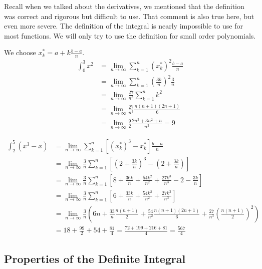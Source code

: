 \documentclass[fleqn]{report}
\begin{document}
Recall when we talked about the derivatives, we mentioned that
the definition was correct and rigorous but difficult to use.
That comment is also true here, but even more severe. The
definition of the integral is nearly impossible to use for
most functions. We will only try to use the definition for
small order polynomials.

\begin{example} 
We choose $x_k^* = a + k \frac{b-a}{n}$.
\begin{align*}
\int_0^3 x^2 
& = \lim_{n \rightarrow \infty} \sum_{k=1}^n (x^*_k)^2
\frac{b-a}{n} \\
& = \lim_{n \rightarrow \infty} \sum_{k=1}^n \left( \frac{3k}{n}
\right)^2 \frac{3}{n} \\
& = \lim_{n \rightarrow \infty} \frac{27}{n^3} \sum_{k=1}^n k^2 \\
& = \lim_{n \rightarrow \infty} \frac{27}{n^3} \frac{n(n+1)(2n+1)}{6} \\
& = \lim_{n \rightarrow \infty} \frac{9}{2}
\frac{2n^3+3n^2+n}{n^3} = 9
\end{align*}
\end{example}

\begin{example}
\begin{align*}
\int_2^5 (x^3-x) 
& = \lim_{n \rightarrow \infty} \sum_{k=1}^n \left[ (x^*_k)^3 -
x^*_k \right] \frac{b-a}{n} \\
& = \lim_{n \rightarrow \infty} \frac{3}{n} \sum_{k=1}^n \left[
\left(2 + \frac{3k}{n} \right)^3 - \left(2+ \frac{3k}{n}
\right) \right] \\
& = \lim_{n \rightarrow \infty} \frac{3}{n} \sum_{k=1}^n \left[
8 + \frac{36k}{n} + \frac{54k^2}{n^2} + \frac{27k^3}{n^3} - 2 -
\frac{3k}{n} \right] \\
& = \lim_{n \rightarrow \infty} \frac{3}{n} \sum_{k=1}^n \left[
6 + \frac{33k}{n} + \frac{54k^2}{n^2} + \frac{27k^3}{n^3} \right] \\
& = \lim_{n \rightarrow \infty} \frac{3}{n} \left( 6n +
\frac{33}{n} \frac{n(n+1)}{2} + \frac{54}{n^2}
\frac{n(n+1)(2n+1)}{6} + \frac{27}{n^3} \left( \frac{n(n+1)}{2}
\right)^2 \right) \\
& = 18 + \frac{99}{2} + 54 + \frac{81}{4} = \frac{72+ 199+ 216+
81}{4} = \frac{567}{4}
\end{align*}
\end{example}

\subsection{Properties of the Definite Integral}
\label{integral-properties}
\end{document}
